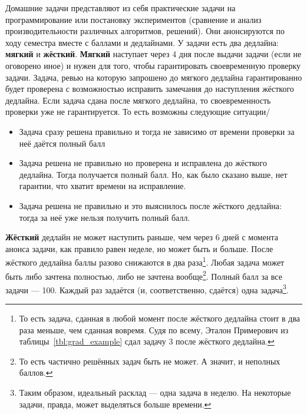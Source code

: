 Домашние задачи представляют из себя практические задачи на программирование или постановку экспериментов (сравнение и анализ производительности различных алгоритмов, решений).
Они анонсируются по ходу семестра вместе с баллами и дедлайнами.
У задачи есть два дедлайна: \textbf{мягкий} и \textbf{жёсткий}.
\textbf{Мягкий} наступает через 4 дня после выдачи задачи (если не оговорено иное) и нужен для того, чтобы гарантировать своевременную проверку задачи. 
Задача, ревью на которую запрошено до мягкого дедлайна гарантированно будет проверена с возможностью исправить замечания до наступления жёсткого дедлайна. Если задача сдана после мягкого дедлайна, то своевременность проверки уже не гарантируется. То есть возможны следующие ситуации/
\begin{itemize}
    \item Задача сразу решена правильно и тогда не зависимо от времени проверки за неё даётся полный балл
    \item Задача решена не правильно но проверена и исправлена до жёсткого дедлайна. Тогда получается полный балл. Но, как было сказано выше, нет гарантии, что хватит времени на исправление.
    \item Задача решена не правильно и это выяснилось после жёсткого дедлайна: тогда за неё уже нельзя получить полный балл.
\end{itemize}
\textbf{Жёсткий} дедлайн не может наступить раньше, чем через 6 дней с момента анонса задачи, как правило равен неделе, но может быть и больше. После жёсткого дедлайна баллы разово снижаются в два раза\footnote{То есть задача, сданная в любой момент после жёсткого дедлайна стоит в два раза меньше, чем сданная вовремя. Судя по всему, Эталон Примерович из таблицы~\ref{tbl:grad_example} сдал задачу 3 после жёсткого дедлайна.}. Любая задача может быть либо зачтена полностью, либо не зачтена вообще\footnote{То есть частично решённых задач быть не может. А значит, и неполных баллов.}. Полный балл за все задачи --- 100. 
Каждый раз задаётся (и, соответственно, сдаётся) одна задача\footnote{Таким образом, идеальный расклад --- одна задача в неделю. На некоторые задачи, правда, может выделяться больше времени.}. 

